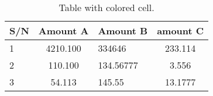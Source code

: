 \documentclass{article}
\begin{document}
	\begin{table}[h!]
		\begin{center}
	\caption{Table with colored cell.}
		\label{tab:Table 1}
		\begin{tabular}{|l|S|s|c|} %
			\hline
			\textbf{S/N} & \textbf{Amount A} & \textbf{Amount B} & \textbf{amount C}\\
			\hline
			1 & 4210.100 & 334646 & 233.114\\
	2 & 110.100 & 134.56777 & 3.556\\
		3 & 54.113 & 145.55 & 13.1777\\
			\hline
			\end{tabular}
		\end{center}
	\end{table}
\end{document}
